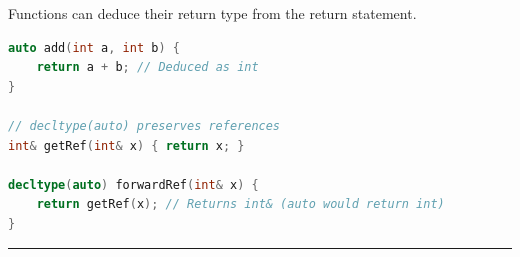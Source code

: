 Functions can deduce their return type from the return statement.

\begin{lstlisting}[language={C++}]
auto add(int a, int b) {
    return a + b; // Deduced as int
}

// decltype(auto) preserves references
int& getRef(int& x) { return x; }

decltype(auto) forwardRef(int& x) {
    return getRef(x); // Returns int& (auto would return int)
}
\end{lstlisting}

\begin{center}\rule{0.5\linewidth}{0.5pt}\end{center}
